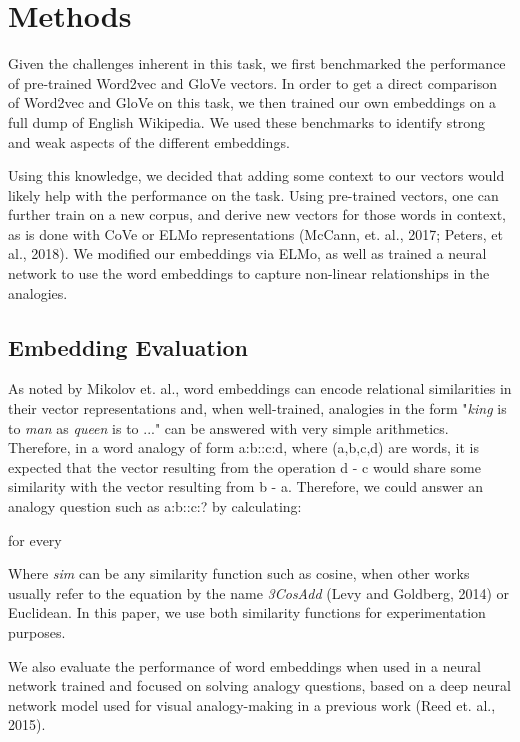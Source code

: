 \documentclass[11pt]{article}
\begin{document}
\section{Methods}

Given the challenges inherent in this task, we first benchmarked the
performance of pre-trained Word2vec and GloVe vectors. In order to get a
direct comparison of Word2vec and GloVe on this task, we then trained
our own embeddings on a full dump of English Wikipedia. We used these
benchmarks to identify strong and weak aspects of the different
embeddings.

Using this knowledge, we decided that adding some context to our vectors would
likely help with the performance on the task. Using pre-trained vectors, one can
further train on a new corpus, and derive new vectors for those words in
context, as is done with CoVe or ELMo representations (McCann, et. al., 2017;
Peters, et al., 2018). We modified our embeddings via ELMo, as well as 
trained a neural network to use the word embeddings to capture non-linear
relationships in the analogies.

\subsection{Embedding Evaluation}

As noted by Mikolov et. al., word embeddings can encode relational similarities
in their vector representations and, when well-trained, analogies in the form
"\emph{king }is to \emph{man }as \emph{queen }is to ..." can be answered with
very simple arithmetics. Therefore, in a word analogy of form a:b::c:d, where
(a,b,c,d) are words, it is expected that the vector resulting from the operation
d - c would share some similarity with the vector resulting from b - a.
Therefore, we could answer an analogy question such as a:b::c:? by calculating:

for every

Where \emph{sim }can be any similarity function such as cosine, when
other works usually refer to the equation by the name \emph{3CosAdd}
(Levy and Goldberg, 2014) or Euclidean. In this paper, we use both
similarity functions for experimentation purposes.

We also evaluate the performance of word embeddings when used in a
neural network trained and focused on solving analogy questions, based
on a deep neural network model used for visual analogy-making in a
previous work (Reed et. al., 2015).
\end{document}
